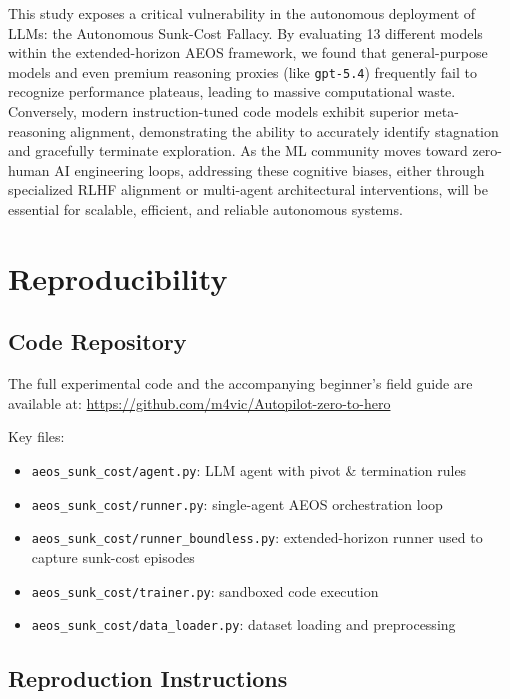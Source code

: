 \documentclass[11pt]{article}
\begin{document}
This study exposes a critical vulnerability in the autonomous deployment of LLMs: the Autonomous Sunk-Cost Fallacy. By evaluating 13 different models within the extended-horizon AEOS framework, we found that general-purpose models and even premium reasoning proxies (like \texttt{gpt-5.4}) frequently fail to recognize performance plateaus, leading to massive computational waste. Conversely, modern instruction-tuned code models exhibit superior meta-reasoning alignment, demonstrating the ability to accurately identify stagnation and gracefully terminate exploration. As the ML community moves toward zero-human AI engineering loops, addressing these cognitive biases, either through specialized RLHF alignment or multi-agent architectural interventions, will be essential for scalable, efficient, and reliable autonomous systems.

\appendix
\section{Reproducibility}
\label{sec:appendix}

\subsection{Code Repository}

The full experimental code and the accompanying beginner's field guide are available at: \url{https://github.com/m4vic/Autopilot-zero-to-hero}

Key files:
\begin{itemize}[nosep]
  \item \texttt{aeos\_sunk\_cost/agent.py}: LLM agent with pivot \& termination rules
  \item \texttt{aeos\_sunk\_cost/runner.py}: single-agent AEOS orchestration loop
  \item \texttt{aeos\_sunk\_cost/runner\_boundless.py}: extended-horizon runner used to capture sunk-cost episodes
  \item \texttt{aeos\_sunk\_cost/trainer.py}: sandboxed code execution
  \item \texttt{aeos\_sunk\_cost/data\_loader.py}: dataset loading and preprocessing
\end{itemize}

\subsection{Reproduction Instructions}
\end{document}
